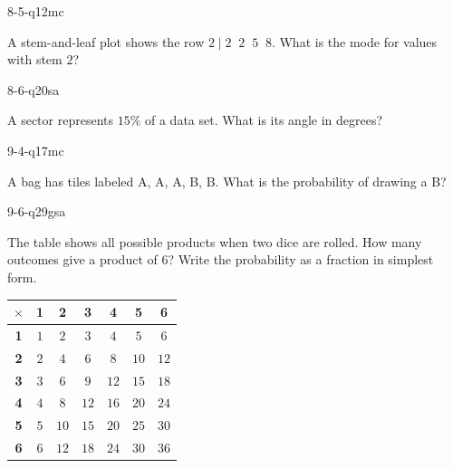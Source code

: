 \begin{practiceQuestion}{8-5-q12}{mc}
\begin{questionText}
A stem-and-leaf plot shows the row $2 \mid 2\;\;2\;\;5\;\;8$. What is the mode for values with stem $2$?
\end{questionText}
\end{practiceQuestion}

\begin{practiceQuestion}{8-6-q20}{sa}
\begin{questionText}
A sector represents $15\%$ of a data set. What is its angle in degrees?
\end{questionText}
\end{practiceQuestion}

\begin{practiceQuestion}{9-4-q17}{mc}
\begin{questionText}
A bag has tiles labeled A, A, A, B, B. What is the probability of drawing a B?
\end{questionText}
\end{practiceQuestion}

\begin{practiceQuestion}{9-6-q29}{gsa}
\begin{questionText}
The table shows all possible products when two dice are rolled. How many outcomes give a product of $6$? Write the probability as a fraction in simplest form.

\begin{center}
\begin{tabular}{|c|c|c|c|c|c|c|}
\hline
$\times$ & \textbf{1} & \textbf{2} & \textbf{3} & \textbf{4} & \textbf{5} & \textbf{6} \\
\hline
\textbf{1} & $1$ & $2$ & $3$ & $4$ & $5$ & $6$ \\
\hline
\textbf{2} & $2$ & $4$ & $6$ & $8$ & $10$ & $12$ \\
\hline
\textbf{3} & $3$ & $6$ & $9$ & $12$ & $15$ & $18$ \\
\hline
\textbf{4} & $4$ & $8$ & $12$ & $16$ & $20$ & $24$ \\
\hline
\textbf{5} & $5$ & $10$ & $15$ & $20$ & $25$ & $30$ \\
\hline
\textbf{6} & $6$ & $12$ & $18$ & $24$ & $30$ & $36$ \\
\hline
\end{tabular}
\end{center}
\end{questionText}
\end{practiceQuestion}

